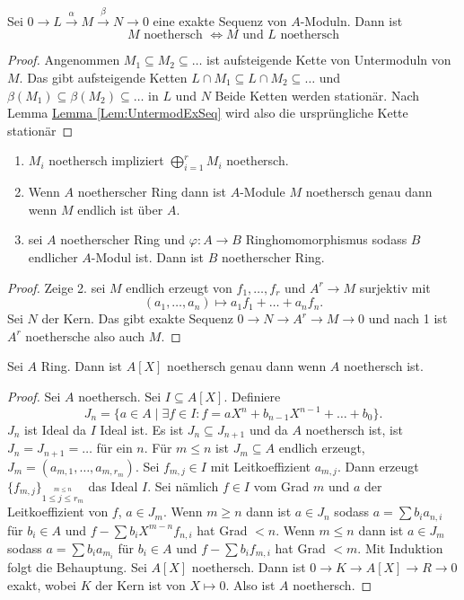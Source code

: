 \begin{Satz}
    Sei $0\to L\stackrel{\alpha}\to M\stackrel \beta\to N\to 0$ eine exakte Sequenz von $A$-Moduln. Dann ist $$M \text{ noethersch } \iff M \text{ und } L \text{ noethersch}$$
\end{Satz}
\begin{proof}
    Angenommen $M_1\subseteq M_2\subseteq \dots$ ist aufsteigende Kette von Untermoduln von $M$. Das gibt aufsteigende Ketten
    $L\cap M_1\subseteq L\cap M_2\subseteq \dots$ und
    $\beta(M_1)\subseteq \beta(M_2)\subseteq \dots$ in $L$ und $N$ Beide Ketten werden stationär. Nach Lemma \hyperref[Lem:UntermodExSeq]{Lemma \ref{Lem:UntermodExSeq}} wird also die ursprüngliche Kette stationär
\end{proof}
\begin{Kor}
    \begin{enumerate}
        \item $M_i$ noethersch impliziert $\bigoplus_{i=1}^rM_i$ noethersch.
        \item Wenn $A$ noetherscher Ring dann ist $A$-Module $M$ noethersch genau dann wenn $M$ endlich ist über $A$.
        \item sei $A$ noetherscher Ring und $\varphi\colon A\to B$ Ringhomomorphismus sodass $B$ endlicher $A$-Modul ist. Dann ist $B$ noetherscher Ring.
    \end{enumerate}
\end{Kor}
\begin{proof}
    Zeige 2. sei $M$ endlich erzeugt von $f_1,\dots,f_r$ und $A^r\to M$ surjektiv mit $$(a_1,\dots,a_n)\mapsto a_1f_1+\dots+a_nf_n.$$ Sei $N$ der Kern. Das gibt exakte Sequenz 
    $0\to N\to A^r\to M\to 0$ und nach 1 ist $A^r$ noethersche also auch $M$.
\end{proof}
\begin{Satz} Sei $A$ Ring.  Dann ist $A[X]$ noethersch genau dann wenn $A$ noethersch ist.
\end{Satz}
\begin{proof}
    Sei $A$ noethersch.
    Sei $I\subseteq A[X]$. Definiere $$J_n=\{a\in A\mid \exists f\in I\colon f=aX^n+b_{n-1}X^{n-1}+\dots+b_0\}.$$ $J_n$ ist Ideal da $I$ Ideal ist. Es ist $J_n\subseteq J_{n+1}$ und da $A$ noethersch ist, ist $J_n=J_{n+1}=\dots$ für ein $n$.
    Für $m\leq n$ ist $J_m\subseteq A$ endlich erzeugt, $J_m=(a_{m,1},\dots,a_{m,r_m})$. Sei $f_{m,j}\in I$ mit Leitkoeffizient $a_{m,j}$. Dann erzeugt $\{f_{m,j}\}_{\stackrel{m\leq n}{1\leq j\leq r_m}}$ das Ideal $I$. Sei nämlich $f\in I$ vom Grad $m$ und $a$ der Leitkoeffizient von $f$, $a\in J_m$.
    Wenn $m\geq n$ dann ist $a\in J_n$ sodass $a=\sum b_ia_{n,i}$ für $b_i\in A$ und $f-\sum b_iX^{m-n}f_{n,i}$ hat Grad $<n$.
    Wenn $m\leq n$ dann ist $a\in J_m$ sodass $a=\sum b_ia_{m_i}$ für $b_i\in A$ und $f-\sum b_if_{m,i}$ hat Grad $<m$. Mit Induktion folgt die Behauptung.
    Sei $A[X]$ noethersch. Dann ist $0\to K\to A[X]\to R\to 0$ exakt, wobei $K$ der Kern ist von $X\mapsto 0$. Also ist $A$ noethersch.
\end{proof}
